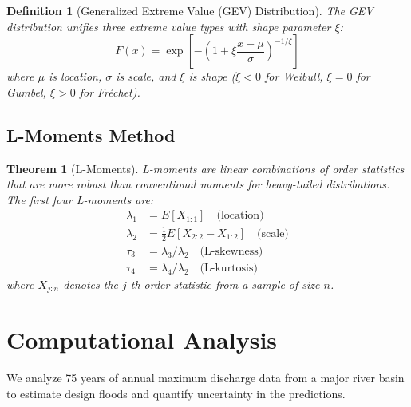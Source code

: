 \documentclass[a4paper, 11pt]{article}
\newtheorem{definition}{Definition}[section]
\newtheorem{theorem}{Theorem}[section]
\begin{document}
\begin{definition}[Generalized Extreme Value (GEV) Distribution]
The GEV distribution unifies three extreme value types with shape parameter $\xi$:
\begin{equation}
F(x) = \exp\left[-\left(1 + \xi\frac{x - \mu}{\sigma}\right)^{-1/\xi}\right]
\end{equation}
where $\mu$ is location, $\sigma$ is scale, and $\xi$ is shape ($\xi < 0$ for Weibull, $\xi = 0$
for Gumbel, $\xi > 0$ for Fréchet).
\end{definition}

\subsection{L-Moments Method}

\begin{theorem}[L-Moments]
L-moments are linear combinations of order statistics that are more robust than conventional
moments for heavy-tailed distributions. The first four L-moments are:
\begin{align}
\lambda_1 &= E[X_{1:1}] \quad \text{(location)} \\
\lambda_2 &= \frac{1}{2}E[X_{2:2} - X_{1:2}] \quad \text{(scale)} \\
\tau_3 &= \lambda_3 / \lambda_2 \quad \text{(L-skewness)} \\
\tau_4 &= \lambda_4 / \lambda_2 \quad \text{(L-kurtosis)}
\end{align}
where $X_{j:n}$ denotes the $j$-th order statistic from a sample of size $n$.
\end{theorem}

\section{Computational Analysis}

We analyze 75 years of annual maximum discharge data from a major river basin to estimate
design floods and quantify uncertainty in the predictions.
\end{document}
